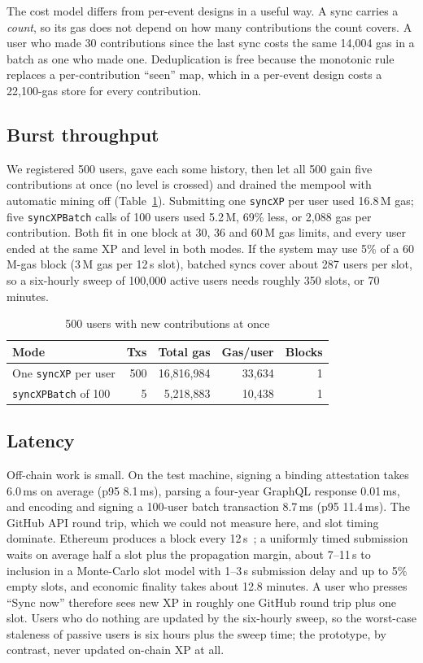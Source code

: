 \documentclass[conference]{IEEEtran}
\begin{document}
The cost model differs from per-event designs in a useful way. A sync carries a \emph{count}, so its gas does not depend on how many contributions the count covers. A user who made 30 contributions since the last sync costs the same 14{,}004 gas in a batch as one who made one. Deduplication is free because the monotonic rule replaces a per-contribution ``seen'' map, which in a per-event design costs a 22{,}100-gas store for every contribution.

\subsection{Burst throughput}
We registered 500 users, gave each some history, then let all 500 gain five contributions at once (no level is crossed) and drained the mempool with automatic mining off (Table~\ref{tab:burst}). Submitting one \texttt{syncXP} per user used 16.8\,M gas; five \texttt{syncXPBatch} calls of 100 users used 5.2\,M, 69\% less, or 2{,}088 gas per contribution. Both fit in one block at 30, 36 and 60\,M gas limits, and every user ended at the same XP and level in both modes. If the system may use 5\% of a 60\,M-gas block (3\,M gas per 12\,s slot), batched syncs cover about 287 users per slot, so a six-hourly sweep of 100{,}000 active users needs roughly 350 slots, or 70 minutes.

\begin{table}[t]
\centering
\caption{500 users with new contributions at once}
\label{tab:burst}
\footnotesize
\setlength{\tabcolsep}{3.5pt}
\begin{tabular}{@{}lrrrr@{}}
\toprule
\textbf{Mode} & \textbf{Txs} & \textbf{Total gas} & \textbf{Gas/user} & \textbf{Blocks}\\
\midrule
One \texttt{syncXP} per user & 500 & 16{,}816{,}984 & 33{,}634 & 1\\
\texttt{syncXPBatch} of 100 & 5 & 5{,}218{,}883 & 10{,}438 & 1\\
\bottomrule
\end{tabular}
\end{table}

\subsection{Latency}
Off-chain work is small. On the test machine, signing a binding attestation takes 6.0\,ms on average (p95 8.1\,ms), parsing a four-year GraphQL response 0.01\,ms, and encoding and signing a 100-user batch transaction 8.7\,ms (p95 11.4\,ms). The GitHub API round trip, which we could not measure here, and slot timing dominate. Ethereum produces a block every 12\,s~\cite{buterin2020gasper}; a uniformly timed submission waits on average half a slot plus the propagation margin, about 7--11\,s to inclusion in a Monte-Carlo slot model with 1--3\,s submission delay and up to 5\% empty slots, and economic finality takes about 12.8 minutes. A user who presses ``Sync now'' therefore sees new XP in roughly one GitHub round trip plus one slot. Users who do nothing are updated by the six-hourly sweep, so the worst-case staleness of passive users is six hours plus the sweep time; the prototype, by contrast, never updated on-chain XP at all.
\end{document}
